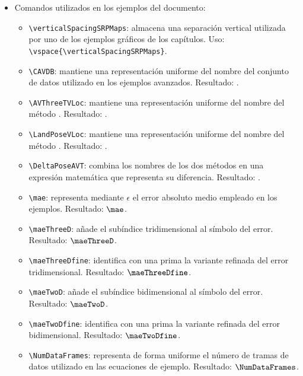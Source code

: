 \begin{itemize}
\begin{itemize}
    \item \texttt{\textbackslash{}diamante}: genera un rombo utilizado como marcador gráfico. Resultado: {\diamante}.
    \item \texttt{\textbackslash{}argmax\{índice\}}: compone el operador matemático \texttt{argmax} colocando debajo el índice indicado. Uso y resultado: \texttt{\textbackslash{}argmax\{i\}} produce \(\argmax{i}\).
  \end{itemize}
  \item Comandos utilizados en los ejemplos del documento:
  \begin{itemize}
    \item \texttt{\textbackslash{}verticalSpacingSRPMaps}: almacena una separación vertical utilizada por uno de los ejemplos gráficos de los capítulos. Uso: \texttt{\textbackslash{}vspace\{\textbackslash{}verticalSpacingSRPMaps\}}.
    \item \texttt{\textbackslash{}CAVDB}: mantiene una representación uniforme del nombre del conjunto de datos utilizado en los ejemplos avanzados. Resultado: \CAVDB{}.
    \item \texttt{\textbackslash{}AVThreeTVLoc}: mantiene una representación uniforme del nombre del método \AVThreeTVLoc{}. Resultado: \AVThreeTVLoc{}.
    \item \texttt{\textbackslash{}LandPoseVLoc}: mantiene una representación uniforme del nombre del método \LandPoseVLoc{}. Resultado: \LandPoseVLoc{}.
    \item \texttt{\textbackslash{}DeltaPoseAVT}: combina los nombres de los dos métodos en una expresión matemática que representa su diferencia. Resultado: \DeltaPoseAVT{}.
    \item \texttt{\textbackslash{}mae}: representa mediante \(\epsilon\) el error absoluto medio empleado en los ejemplos. Resultado: \(\mae\).
    \item \texttt{\textbackslash{}maeThreeD}: añade el subíndice tridimensional al símbolo del error. Resultado: \(\maeThreeD\).
    \item \texttt{\textbackslash{}maeThreeDfine}: identifica con una prima la variante refinada del error tridimensional. Resultado: \(\maeThreeDfine\).
    \item \texttt{\textbackslash{}maeTwoD}: añade el subíndice bidimensional al símbolo del error. Resultado: \(\maeTwoD\).
    \item \texttt{\textbackslash{}maeTwoDfine}: identifica con una prima la variante refinada del error bidimensional. Resultado: \(\maeTwoDfine\).
    \item \texttt{\textbackslash{}NumDataFrames}: representa de forma uniforme el número de tramas de datos utilizado en las ecuaciones de ejemplo. Resultado: \(\NumDataFrames\).
  \end{itemize}
\end{itemize}

